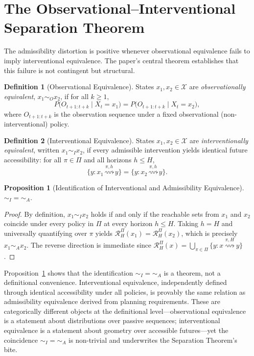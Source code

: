 \documentclass[11pt, a4paper]{article}
\theoremstyle{plain}
\newtheorem{proposition}{Proposition}
\theoremstyle{definition}
\newtheorem{definition}{Definition}
\theoremstyle{remark}
\newcommand{\simA}{\sim_A}
\newcommand{\simO}{\sim_O}
\newcommand{\simI}{\sim_I}
\newcommand{\RHP}{\mathcal{R}_H^\Pi}
\begin{document}
\section{The Observational--Interventional Separation Theorem}

The admissibility distortion is positive whenever observational equivalence
fails to imply interventional equivalence. The paper's central theorem
establishes that this failure is not contingent but structural.

\begin{definition}[Observational Equivalence]
\label{def:obs}
States $x_1, x_2 \in \mathcal{X}$ are \emph{observationally equivalent},
$x_1 \simO x_2$, if for all $k \geq 1$,
\begin{equation}
  P\!\bigl(O_{t+1:t+k} \mid X_t = x_1\bigr)
  = P\!\bigl(O_{t+1:t+k} \mid X_t = x_2\bigr),
\end{equation}
where $O_{t+1:t+k}$ is the observation sequence under a fixed observational
(non-interventional) policy.
\end{definition}

\begin{definition}[Interventional Equivalence]
\label{def:int}
States $x_1, x_2 \in \mathcal{X}$ are \emph{interventionally equivalent},
written $x_1 \simI x_2$, if every admissible intervention yields identical
future accessibility: for all $\pi \in \Pi$ and all horizons $h \leq H$,
\begin{equation}
  \{y : x_1 \overset{\pi,h}{\rightsquigarrow} y\}
  = \{y : x_2 \overset{\pi,h}{\rightsquigarrow} y\}.
\end{equation}
\end{definition}

\begin{proposition}[Identification of Interventional and Admissibility Equivalence]
\label{prop:id}
${\simI} = {\simA}$.
\end{proposition}

\begin{proof}
By definition, $x_1 \simI x_2$ holds if and only if the reachable sets
from $x_1$ and $x_2$ coincide under every policy in $\Pi$ at every horizon
$h \leq H$. Taking $h = H$ and universally quantifying over $\pi$ yields
$\RHP(x_1) = \RHP(x_2)$, which is precisely $x_1 \simA x_2$. The reverse
direction is immediate since $\RHP(x) = \bigcup_{\pi \in \Pi}
\{y : x \overset{\pi,H}{\rightsquigarrow} y\}$.
\end{proof}

Proposition~\ref{prop:id} shows that the identification $\simI = \simA$ is a
theorem, not a definitional convenience. Interventional equivalence,
independently defined through identical accessibility under all policies, is
provably the same relation as admissibility equivalence derived from planning
requirements. These are categorically different objects at the definitional
level---observational equivalence is a statement about distributions over passive
sequences; interventional equivalence is a statement about geometry over
accessible futures---yet the coincidence $\simI = \simA$ is non-trivial and
underwrites the Separation Theorem's bite.
\end{document}
